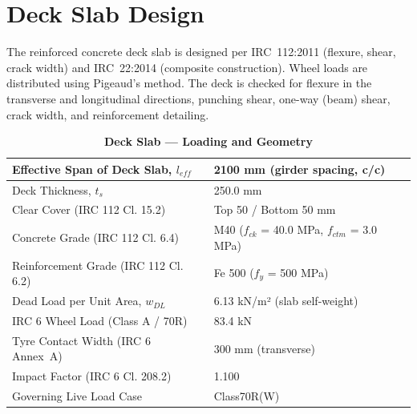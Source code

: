 \documentclass[12pt,a4paper]{report}
\numberwithin{table}{chapter}
\numberwithin{figure}{chapter}
\begin{document}
\section{Deck Slab Design}
\label{sec:deck-design}

The reinforced concrete deck slab is designed per IRC~112:2011 (flexure, shear, crack width) and IRC~22:2014 (composite construction). Wheel loads are distributed using Pigeaud's method. The deck is checked for flexure in the transverse and longitudinal directions, punching shear, one-way (beam) shear, crack width, and reinforcement detailing.

\vspace{1em}
\begin{longtable}{|L{5.5cm}|p{10.0cm}|}
\caption{\textbf{Deck Slab --- Loading and Geometry}}
\hline
\textnormal{Effective Span of Deck Slab, $l_{eff}$} & 2100 mm (girder spacing, c/c) \\[6pt]
\hline
\textnormal{Deck Thickness, $t_s$} & 250.0 mm \\[6pt]
\hline
\textnormal{Clear Cover (IRC 112 Cl. 15.2)} & Top 50 / Bottom 50 mm \\[6pt]
\hline
\textnormal{Concrete Grade (IRC 112 Cl. 6.4)} & M40 ($f_{ck}$ = 40.0 MPa, $f_{ctm}$ = 3.0 MPa) \\[6pt]
\hline
\textnormal{Reinforcement Grade (IRC 112 Cl. 6.2)} & Fe 500 ($f_y$ = 500 MPa) \\[6pt]
\hline
\textnormal{Dead Load per Unit Area, $w_{DL}$} & 6.13 kN/m² (slab self-weight) \\[6pt]
\hline
\textnormal{IRC 6 Wheel Load (Class A / 70R)} & 83.4 kN \\[6pt]
\hline
\textnormal{Tyre Contact Width (IRC 6 Annex~A)} & 300 mm (transverse) \\[6pt]
\hline
\textnormal{Impact Factor (IRC 6 Cl. 208.2)} & 1.100 \\[6pt]
\hline
\textnormal{Governing Live Load Case} & Class70R(W) \\[6pt]
\hline
\end{longtable}
\end{document}
